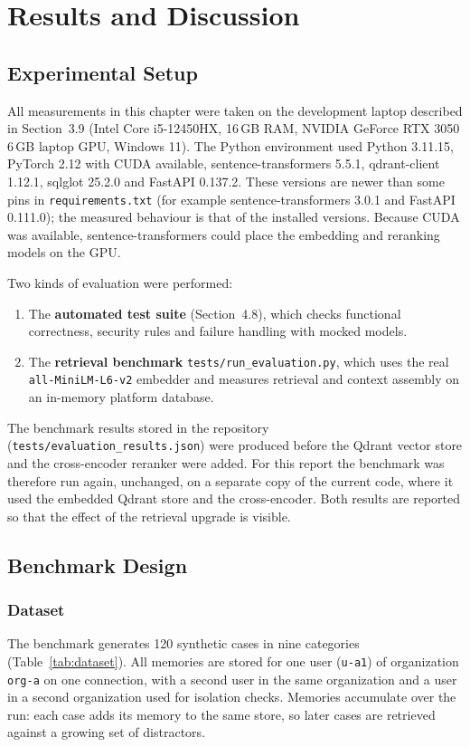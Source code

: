 \chapter{Results and Discussion}

\section{Experimental Setup}
All measurements in this chapter were taken on the development laptop described in
Section~3.9 (Intel Core i5-12450HX, 16\,GB RAM, NVIDIA GeForce RTX 3050 6\,GB laptop GPU,
Windows 11). The Python environment used Python 3.11.15, PyTorch 2.12 with CUDA available,
sentence-transformers 5.5.1, qdrant-client 1.12.1, sqlglot 25.2.0 and FastAPI 0.137.2.
These versions are newer than some pins in \texttt{requirements.txt} (for example
sentence-transformers 3.0.1 and FastAPI 0.111.0); the measured behaviour is that of the
installed versions. Because CUDA was available, sentence-transformers could place the
embedding and reranking models on the GPU.

Two kinds of evaluation were performed:
\begin{enumerate}[label=\arabic*., leftmargin=*, topsep=4pt, itemsep=3pt]
    \item The \textbf{automated test suite} (Section~4.8), which checks functional
          correctness, security rules and failure handling with mocked models.
    \item The \textbf{retrieval benchmark} \texttt{tests/run\_evaluation.py}, which uses the
          real \texttt{all-MiniLM-L6-v2} embedder and measures retrieval and context
          assembly on an in-memory platform database.
\end{enumerate}
The benchmark results stored in the repository (\texttt{tests/evaluation\_results.json})
were produced before the Qdrant vector store and the cross-encoder reranker were added.
For this report the benchmark was therefore run again, unchanged, on a separate copy of the
current code, where it used the embedded Qdrant store and the cross-encoder. Both results
are reported so that the effect of the retrieval upgrade is visible.

\section{Benchmark Design}

\subsection{Dataset}
The benchmark generates 120 synthetic cases in nine categories (Table~\ref{tab:dataset}).
All memories are stored for one user (\texttt{u-a1}) of organization \texttt{org-a} on one
connection, with a second user in the same organization and a user in a second organization
used for isolation checks. Memories accumulate over the run: each case adds its memory to
the same store, so later cases are retrieved against a growing set of distractors.

